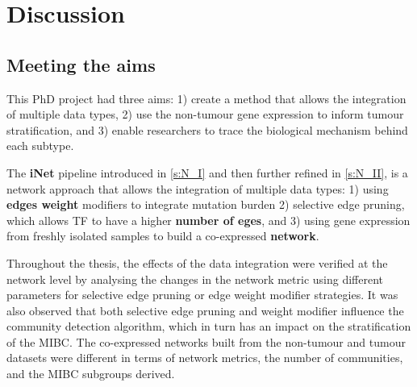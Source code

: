 \chapter{Discussion} \label{s:discussion}

\vspace{3mm}
\vspace{3mm}


\section{Meeting the aims}

This PhD project had three aims: 1) create a method that allows the integration of multiple data types, 2) use the non-tumour gene expression to inform tumour stratification, and 3) enable researchers to trace the biological mechanism behind each subtype.

The \textbf{iNet} pipeline introduced in \cref{s:N_I} and then further refined in \cref{s:N_II}, is a network approach that allows the integration of multiple data types: 1) using \textbf{edges weight} modifiers to integrate mutation burden 2) selective edge pruning, which allows \gls{TF} to have a higher \textbf{number of eges}, and 3) using gene expression from freshly isolated samples to build a co-expressed \textbf{network}. 

Throughout the thesis, the effects of the data integration were verified at the network level by analysing the changes in the network metric using different parameters for selective edge pruning or edge weight modifier strategies. It was also observed that both selective edge pruning and weight modifier influence the community detection algorithm, which in turn has an impact on the stratification of the MIBC. The co-expressed networks built from the non-tumour and tumour datasets were different in terms of network metrics, the number of communities, and the MIBC subgroups derived.

